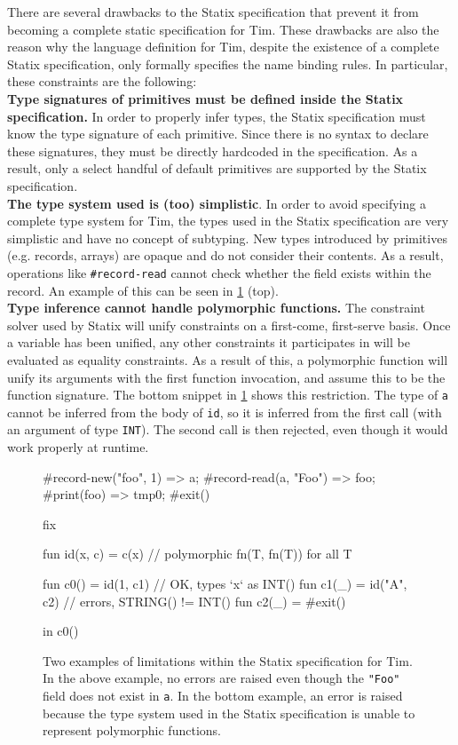 There are several drawbacks to the Statix specification that prevent it from becoming a complete static specification for Tim. These drawbacks are also the reason why the language definition for Tim, despite the existence of a complete Statix specification, only formally specifies the name binding rules. In particular, these constraints are the following:\\

\noindent \textbf{Type signatures of primitives must be defined inside the Statix specification.} In order to properly infer types, the Statix specification must know the type signature of each primitive. Since there is no syntax to declare these signatures, they must be directly hardcoded in the specification. As a result, only a select handful of default primitives are supported by the Statix specification.\\

\noindent \textbf{The type system used is (too) simplistic}. In order to avoid specifying a complete type system for Tim, the types used in the Statix specification are very simplistic and have no concept of subtyping. New types introduced by primitives (e.g. records, arrays) are opaque and do not consider their contents. As a result, operations like \texttt{\#record-read} cannot check whether the field exists within the record. An example of this can be seen in \cref{fig:tim_statix_limitations} (top).\\

\noindent \textbf{Type inference cannot handle polymorphic functions.} The constraint solver used by Statix will unify constraints on a first-come, first-serve basis. Once a variable has been unified, any other constraints it participates in will be evaluated as equality constraints. As a result of this, a polymorphic function will unify its arguments with the first function invocation, and assume this to be the function signature. The bottom snippet in \cref{fig:tim_statix_limitations} shows this restriction. The type of \texttt{a} cannot be inferred from the body of \texttt{id}, so it is inferred from the first call (with an argument of type \texttt{INT}). The second call is then rejected, even though it would work properly at runtime.

\begin{figure}
  \begin{tim}
#record-new("foo", 1) => a;
#record-read(a, "Foo") => foo;
#print(foo) => tmp0;
#exit()
  \end{tim}
  \begin{tim}
fix {
  fun id(x, c) = c(x) // polymorphic fn(T, fn(T)) for all T
  
  fun c0() = id(1, c1) // OK, types `x` as INT()
  fun c1(_) = id("A", c2) // errors, STRING() != INT()
  fun c2(_) = #exit()
} in c0()
  \end{tim}
  \caption{Two examples of limitations within the Statix specification for Tim. In the above example, no errors are raised even though the \texttt{"Foo"} field does not exist in \texttt{a}. In the bottom example, an error is raised because the type system used in the Statix specification is unable to represent polymorphic functions.}
  \label{fig:tim_statix_limitations}
\end{figure}

